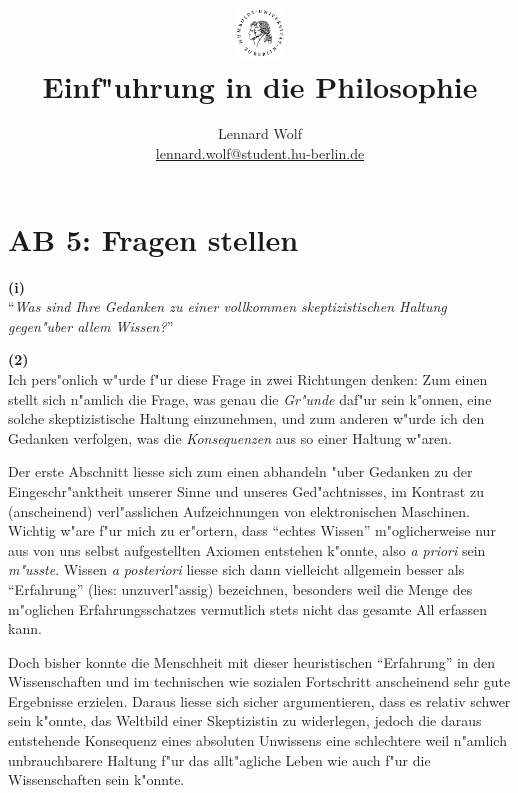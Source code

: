 \documentclass[a4paper]{article}
\date{\vspace{-3ex}}
\begin{document}
\title{
    \vspace{-30pt}
	\includegraphics*[width=0.1\textwidth,left]{images/hu_logo2.png}\\
	\vspace{-10pt}
	Einf"uhrung in die Philosophie}
\author{Lennard Wolf\\
        \small{\href{mailto:lennard.wolf@student.hu-berlin.de}{lennard.wolf@student.hu-berlin.de}}}
\maketitle
\vspace{0pt}

\section*{AB 5: Fragen stellen}
\large

\vspace{10pt}
\noindent\textbf{(i)}\\
"`\emph{Was sind Ihre Gedanken zu einer vollkommen skeptizistischen Haltung gegen"uber allem Wissen?}"'


\vspace{8pt}
\noindent\textbf{(2)}\\
Ich pers"onlich w"urde f"ur diese Frage in zwei Richtungen denken: Zum einen stellt sich n"amlich die Frage, was genau die \emph{Gr"unde} daf"ur sein k"onnen, eine solche skeptizistische Haltung einzunehmen, und zum anderen w"urde ich den Gedanken verfolgen, was die \emph{Konsequenzen} aus so einer Haltung w"aren.

Der erste Abschnitt liesse sich zum einen abhandeln "uber Gedanken zu der Eingeschr"anktheit unserer Sinne und unseres Ged"achtnisses, im Kontrast zu (anscheinend) verl"asslichen Aufzeichnungen von elektronischen Maschinen. Wichtig w"are f"ur mich zu er"ortern, dass "`echtes Wissen"' m"oglicherweise nur aus von uns selbst aufgestellten Axiomen entstehen k"onnte, also \emph{a priori} sein \emph{m"usste}. Wissen \emph{a posteriori} liesse sich dann vielleicht allgemein besser als "`Erfahrung"' (lies: unzuverl"assig) bezeichnen, besonders weil die Menge des m"oglichen Erfahrungsschatzes vermutlich stets nicht das gesamte All erfassen kann. 

Doch bisher konnte die Menschheit mit dieser heuristischen "`Erfahrung"' in den Wissenschaften und im technischen wie sozialen Fortschritt anscheinend sehr gute Ergebnisse erzielen. Daraus liesse sich sicher argumentieren, dass es relativ schwer sein k"onnte, das Weltbild einer Skeptizistin zu widerlegen, jedoch die daraus entstehende Konsequenz eines absoluten Unwissens eine schlechtere weil n"amlich unbrauchbarere Haltung f"ur das allt"agliche Leben wie auch f"ur die Wissenschaften sein k"onnte.
\end{document}
